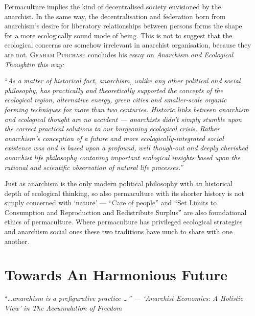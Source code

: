 \documentclass[a4paper, 11pt]{article}
\begin{document}
\begin{multicols*}{2}
Permaculture implies the kind of decentralised society envisioned by the anarchist.  In the same way, the decentralisation and federation born from anarchism's desire for liberatory relationships between persons forms the shape for a more ecologically sound mode of being.  This is not to suggest that the ecological concerns are somehow irrelevant in anarchist organisation, because they are not.  \textsc{Graham Purchase} concludes his essay on \em{Anarchism and Ecological Thought}\em in this way:

\vspace{1mm}
``\em{As a matter of historical fact, anarchism, unlike any other political and social philosophy, has practically and theoretically supported the concepts of the ecological region, alternative energy, green cities and smaller-scale organic farming techniques for more than two centuries.  Historic links between anarchism and ecological thought are no accident --- anarchists didn't simply stumble upon the correct practical solutions to our burgeoning ecological crisis.  Rather anarchism's conception of a future and more ecologically-integrated social existence was and is based upon a profound, well though-out and deeply cherished anarchist life philosophy contaning important ecological insights based upon the rational and scientific observation of natural life processes.}\em'' 
\vspace{1mm}

Just as anarchism is the only modern political philosophy with an historical depth of ecological thinking, so also permaculture with its shorter history is not simply concerned with `nature' --- ``Care of people'' and ``Set Limits to Consumption and Reproduction and Redistribute Surplus'' are also foundational ethics of permaculture.  Where permaculture has privileged ecological strategies and anarchism social ones these two traditions have much to share with one another.

\section*{Towards An Harmonious Future}

``\em{\ldots anarchism is a \em prefigurative \em practice \ldots }\em'' --- `Anarchist Economics: A Holistic View' in \em{The Accumulation of Freedom}\em
\vspace{1mm}


\end{multicols*}
\end{document}
